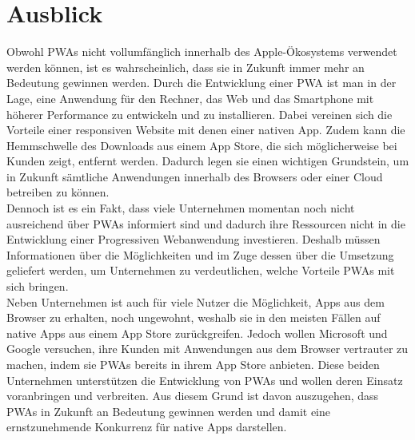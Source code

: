 \chapter{Ausblick}
Obwohl PWAs nicht vollumfänglich innerhalb des Apple-Ökosystems verwendet werden können, ist es wahrscheinlich, dass sie in Zukunft immer mehr an Bedeutung gewinnen werden. Durch die Entwicklung einer PWA ist man in der Lage, eine Anwendung für den Rechner, das Web und das Smartphone mit höherer Performance zu entwickeln und zu installieren. Dabei vereinen sich die Vorteile einer responsiven Website mit denen einer nativen App. Zudem kann die Hemmschwelle des Downloads aus einem App Store, die sich möglicherweise bei Kunden zeigt, entfernt werden. Dadurch legen sie einen wichtigen Grundstein, um in Zukunft sämtliche Anwendungen innerhalb des Browsers oder einer Cloud betreiben zu können.\\
Dennoch ist es ein Fakt, dass viele Unternehmen momentan noch nicht ausreichend über PWAs informiert sind und dadurch ihre Ressourcen nicht in die Entwicklung einer Progressiven Webanwendung investieren. Deshalb müssen Informationen über die Möglichkeiten und im Zuge dessen über die Umsetzung geliefert werden, um Unternehmen zu verdeutlichen, welche Vorteile PWAs mit sich bringen.\\
Neben Unternehmen ist auch für viele Nutzer die Möglichkeit, Apps aus dem Browser zu erhalten, noch ungewohnt, weshalb sie in den meisten Fällen auf native Apps aus einem App Store zurückgreifen. Jedoch wollen Microsoft und Google versuchen, ihre Kunden mit Anwendungen aus dem Browser vertrauter zu machen, indem sie PWAs bereits in ihrem App Store anbieten. Diese beiden Unternehmen unterstützen die Entwicklung von PWAs und wollen deren Einsatz voranbringen und verbreiten. Aus diesem Grund ist davon auszugehen, dass PWAs in Zukunft an Bedeutung gewinnen werden und damit eine ernstzunehmende Konkurrenz für native Apps darstellen. 
